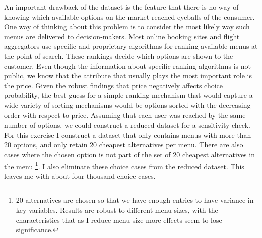 \documentclass[a4paper,12pt]{article}
\begin{document}
An important drawback of the dataset is the feature that there is no way of knowing which available options on the market reached eyeballs of the consumer. One way of thinking about this problem is to consider the most likely way such menus are delivered to decision-makers. Most online booking sites and flight aggregators use specific and proprietary algorithms for ranking available menus at the point of search. These rankings decide which options are shown to the customer. Even though the information about specific ranking algorithms is not public, we know that the attribute that usually plays the most important role is the price. Given the robust findings that price negatively affects choice probability, the best guess for a simple ranking mechanism that would capture a wide variety of sorting mechanisms would be options sorted with the decreasing order with respect to price. Assuming that each user was reached by the same number of options, we could construct a reduced dataset for a sensitivity check. For this exercise I construct a dataset that only contains menus with more than 20 options, and only retain 20 cheapest alternatives per menu. There are also cases where the chosen option is not part of the set of 20 cheapest alternatives in the menu \footnote{20 alternatives are chosen so that we have enough entries to have variance in key variables. Results are robust to different menu sizes, with the characteristics that as I reduce menu size more effects seem to lose significance.}. I also eliminate these choice cases from the reduced dataset. This leaves me with about four thousand choice cases.

\clearpage
\end{document}
